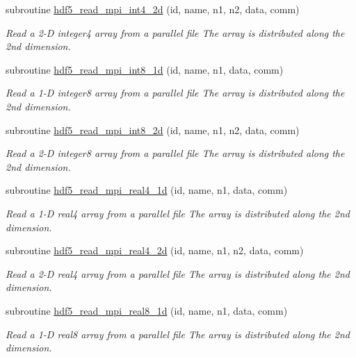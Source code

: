 \begin{DoxyCompactItemize}
subroutine \hyperlink{namespacemodhdf5_ac96ae5057bcd6745840c716a232d4b66}{hdf5\+\_\+read\+\_\+mpi\+\_\+int4\+\_\+2d} (id, name, n1, n2, data, comm)
\begin{DoxyCompactList}\small\item\em Read a 2-\/D integer4 array from a parallel file The array is distributed along the 2nd dimension. \end{DoxyCompactList}\item 
subroutine \hyperlink{namespacemodhdf5_a2847f70176f88d95e8e6e1bec3a2539e}{hdf5\+\_\+read\+\_\+mpi\+\_\+int8\+\_\+1d} (id, name, n1, data, comm)
\begin{DoxyCompactList}\small\item\em Read a 1-\/D integer8 array from a parallel file The array is distributed along the 2nd dimension. \end{DoxyCompactList}\item 
subroutine \hyperlink{namespacemodhdf5_a41bc63b78ce861c9898ef45642514a9d}{hdf5\+\_\+read\+\_\+mpi\+\_\+int8\+\_\+2d} (id, name, n1, n2, data, comm)
\begin{DoxyCompactList}\small\item\em Read a 2-\/D integer8 array from a parallel file The array is distributed along the 2nd dimension. \end{DoxyCompactList}\item 
subroutine \hyperlink{namespacemodhdf5_a7c2f69141e8a85768536e7c8f79f6348}{hdf5\+\_\+read\+\_\+mpi\+\_\+real4\+\_\+1d} (id, name, n1, data, comm)
\begin{DoxyCompactList}\small\item\em Read a 1-\/D real4 array from a parallel file The array is distributed along the 2nd dimension. \end{DoxyCompactList}\item 
subroutine \hyperlink{namespacemodhdf5_a406b07a6320d4dd08a12ca4b8d6b9e9d}{hdf5\+\_\+read\+\_\+mpi\+\_\+real4\+\_\+2d} (id, name, n1, n2, data, comm)
\begin{DoxyCompactList}\small\item\em Read a 2-\/D real4 array from a parallel file The array is distributed along the 2nd dimension. \end{DoxyCompactList}\item 
subroutine \hyperlink{namespacemodhdf5_afaf6a2a85551a1a7e9638d597c39dc32}{hdf5\+\_\+read\+\_\+mpi\+\_\+real8\+\_\+1d} (id, name, n1, data, comm)
\begin{DoxyCompactList}\small\item\em Read a 1-\/D real8 array from a parallel file The array is distributed along the 2nd dimension. \end{DoxyCompactList}\item 

\end{DoxyCompactItemize}
